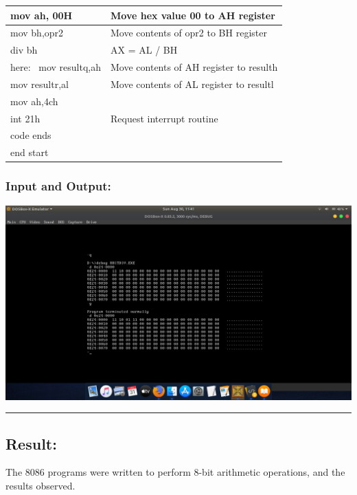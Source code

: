 \documentclass[12pt,a4paper]{article}
\begin{document}
\begin{flushleft}
\begin{table}[h]
{\begin{tabular}{|l|l|}
\hline
mov ah, 00H                                                      & Move hex value 00 to AH register              \\
\hline
mov bh,opr2                                                      & Move contents of opr2 to BH register          \\ 
\hline
div bh                                                           & AX = AL / BH                                  \\ 
\hline
here:~ mov resultq,ah                                            & Move contents of AH register to resulth       \\ 
\hline
mov resultr,al                                                   & Move contents of AL register to resultl       \\ 
\hline
mov ah,4ch                                                       &                                               \\ 
\hline
int 21h                                                          & Request interrupt routine                     \\ 
\hline
code ends                                                        &                                               \\ 
\hline
end start                                                        &                                               \\
\hline
\end{tabular}
}
\end{table}

\subsubsection*{\textbf{Input and Output:}}
\includegraphics[trim = 100mm 60mm 100mm 80mm, clip, width = \textwidth]{Division.png}

\hrule
\subsection*{\textbf{Result:}}
The 8086 programs were written to perform 8-bit arithmetic operations, and the results observed.
\end{flushleft}
\end{document}
